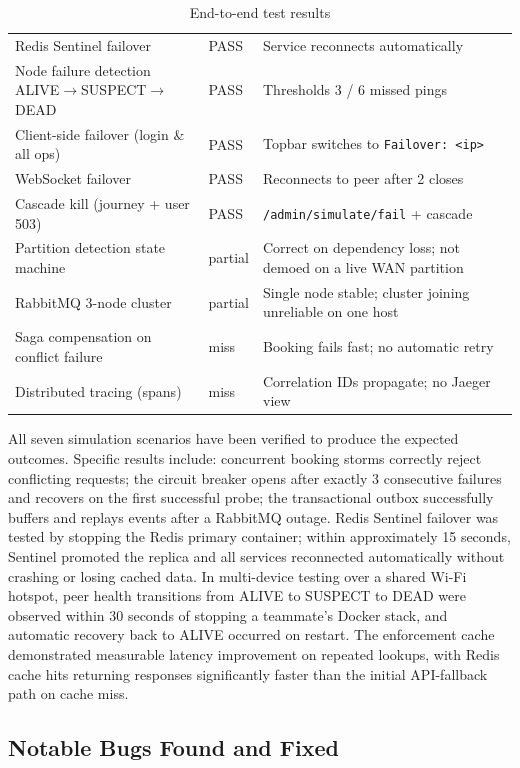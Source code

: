 \documentclass[12pt,a4paper]{article}
\begin{document}
\begin{table}[H]
\begin{tabularx}{\textwidth}{L{4.8cm} L{1.2cm} X}
  Redis Sentinel failover                  & PASS & Service reconnects automatically \\
  Node failure detection ALIVE$\to$SUSPECT$\to$DEAD & PASS & Thresholds 3 / 6 missed pings \\
  Client-side failover (login \& all ops)  & PASS & Topbar switches to \texttt{Failover: <ip>} \\
  WebSocket failover                       & PASS & Reconnects to peer after 2 closes \\
  Cascade kill (journey + user 503)        & PASS & \texttt{/admin/simulate/fail} + cascade \\
  Partition detection state machine        & partial & Correct on dependency loss; not demoed on a live WAN partition \\
  RabbitMQ 3-node cluster                  & partial & Single node stable; cluster joining unreliable on one host \\
  Saga compensation on conflict failure    & miss    & Booking fails fast; no automatic retry \\
  Distributed tracing (spans)              & miss    & Correlation IDs propagate; no Jaeger view \\
  \bottomrule
\end{tabularx}
\caption{End-to-end test results}
\label{tab:results}
\end{table}

All seven simulation scenarios have been verified to produce the expected outcomes. Specific results include: concurrent booking storms correctly reject conflicting requests; the circuit breaker opens after exactly 3 consecutive failures and recovers on the first successful probe; the transactional outbox successfully buffers and replays events after a RabbitMQ outage. Redis Sentinel failover was tested by stopping the Redis primary container; within approximately 15 seconds, Sentinel promoted the replica and all services reconnected automatically without crashing or losing cached data. In multi-device testing over a shared Wi-Fi hotspot, peer health transitions from ALIVE to SUSPECT to DEAD were observed within 30 seconds of stopping a teammate's Docker stack, and automatic recovery back to ALIVE occurred on restart. The enforcement cache demonstrated measurable latency improvement on repeated lookups, with Redis cache hits returning responses significantly faster than the initial API-fallback path on cache miss.

\subsection{Notable Bugs Found and Fixed}
\end{document}
